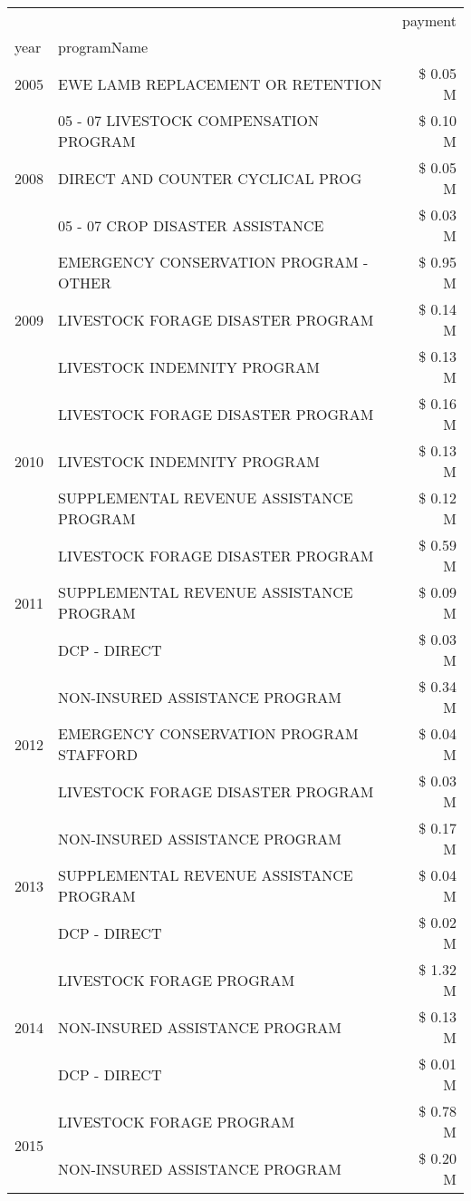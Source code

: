 \begin{tabular}{llr}
\toprule
 &  & payment \\
year & programName &  \\
\midrule
2005 & EWE LAMB REPLACEMENT OR RETENTION & \$ 0.05 M \\
\cline{1-3}
\multirow[t]{3}{*}{2008} & 05 - 07 LIVESTOCK COMPENSATION PROGRAM & \$ 0.10 M \\
 & DIRECT AND COUNTER CYCLICAL PROG & \$ 0.05 M \\
 & 05 - 07 CROP DISASTER ASSISTANCE & \$ 0.03 M \\
\cline{1-3}
\multirow[t]{3}{*}{2009} & EMERGENCY CONSERVATION PROGRAM - OTHER & \$ 0.95 M \\
 & LIVESTOCK FORAGE DISASTER  PROGRAM & \$ 0.14 M \\
 & LIVESTOCK INDEMNITY PROGRAM & \$ 0.13 M \\
\cline{1-3}
\multirow[t]{3}{*}{2010} & LIVESTOCK FORAGE DISASTER PROGRAM & \$ 0.16 M \\
 & LIVESTOCK INDEMNITY PROGRAM & \$ 0.13 M \\
 & SUPPLEMENTAL REVENUE ASSISTANCE PROGRAM & \$ 0.12 M \\
\cline{1-3}
\multirow[t]{3}{*}{2011} & LIVESTOCK FORAGE DISASTER PROGRAM & \$ 0.59 M \\
 & SUPPLEMENTAL REVENUE ASSISTANCE PROGRAM & \$ 0.09 M \\
 & DCP - DIRECT & \$ 0.03 M \\
\cline{1-3}
\multirow[t]{3}{*}{2012} & NON-INSURED ASSISTANCE PROGRAM & \$ 0.34 M \\
 & EMERGENCY CONSERVATION PROGRAM STAFFORD & \$ 0.04 M \\
 & LIVESTOCK FORAGE DISASTER PROGRAM & \$ 0.03 M \\
\cline{1-3}
\multirow[t]{3}{*}{2013} & NON-INSURED ASSISTANCE PROGRAM & \$ 0.17 M \\
 & SUPPLEMENTAL REVENUE ASSISTANCE PROGRAM & \$ 0.04 M \\
 & DCP - DIRECT & \$ 0.02 M \\
\cline{1-3}
\multirow[t]{3}{*}{2014} & LIVESTOCK FORAGE PROGRAM & \$ 1.32 M \\
 & NON-INSURED ASSISTANCE PROGRAM & \$ 0.13 M \\
 & DCP - DIRECT & \$ 0.01 M \\
\cline{1-3}
\multirow[t]{3}{*}{2015} & LIVESTOCK FORAGE PROGRAM & \$ 0.78 M \\
 & NON-INSURED ASSISTANCE PROGRAM & \$ 0.20 M \\

\end{tabular}
